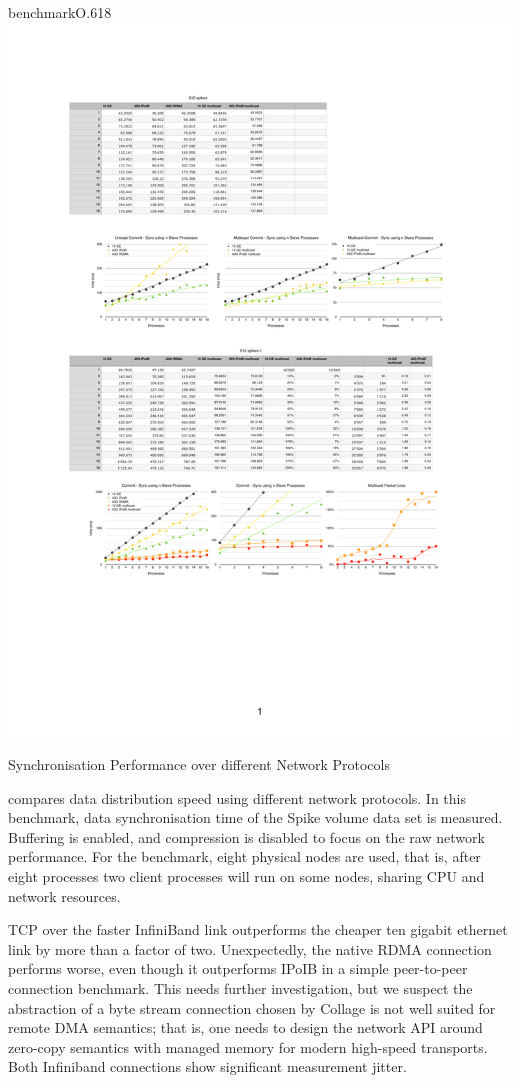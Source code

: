\begin{wrapfloat}{benchmark}{O}{.618\textwidth}
  \includegraphics[width=.618\textwidth]{results/network}
  {\caption{\label{rNetwork}Synchronisation Performance over different Network Protocols}}
\end{wrapfloat}

 compares data distribution speed using different network
protocols. In this benchmark, data synchronisation time of the Spike volume
data set is measured. Buffering is enabled, and compression is disabled to
focus on the raw network performance. For the benchmark, eight physical nodes
are used, that is, after eight processes two client processes will run on some
nodes, sharing CPU and network resources.

TCP over the faster InfiniBand link outperforms the cheaper ten gigabit
ethernet link by more than a factor of two. Unexpectedly, the native RDMA
connection performs worse, even though it outperforms IPoIB in a simple
peer-to-peer connection benchmark. This needs further investigation, but we
suspect the abstraction of a byte stream connection chosen by Collage is not
well suited for remote DMA semantics; that is, one needs to design the network
API around zero-copy semantics with managed memory for modern high-speed
transports. Both Infiniband connections show significant measurement jitter.

